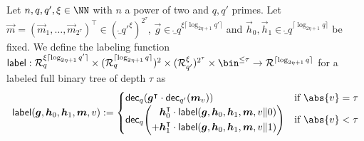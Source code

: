 
\begin{definition}\label{def:label}
  Let $n,q,q',\xi\in\NN$ with $n$ a power of two and $q,q'$ primes.
  Let $\vec{m}=(\vec{m}_{1},\dots,\vec{m}_{{2^{\tau}}})^\intercal\in(\ring_{q'}^\xi)^{2^{\tau}}$, $\vec{g} \in \ring_{q}^{\xi\lceil\log_{2\eta+1} q'\rceil}$ and $\vec{h}_0,\vec{h}_1 \in \ring_q^{\lceil\log_{2\eta+1} q\rceil}$ be fixed.
  We define the labeling function $\lbl : \ring_{q}^{\xi\lceil\log_{2\eta+1} q'\rceil} \times (\ring_q^{\lceil\log_{2\eta+1} q\rceil})^2 \times (\ring^\xi_{q'})^{2^{\tau}}\times \bin^{\leq \tau} \to \ring^{\lceil \log_{2\eta+1} q \rceil}$ for a labeled full binary tree of depth $\tau$ as
  \[
    \lbl(\vec{g}, \vec{h}_0,\vec{h}_1,\vec{m},v) := \begin{cases} \decomp_{q}(\vec{g}^\intercal\cdot \decomp_{q'}(\vec{m}_{v})) & \text{if } \abs{v}=\tau\\ \decomp_q\mleft(\begin{aligned}\vec{h}_0^\intercal \cdot\lbl(\vec{g},\vec{h}_0,\vec{h}_1,\vec{m},v\Vert 0)\\ + \vec{h}_1^\intercal \cdot\lbl(\vec{g},\vec{h}_0,\vec{h}_1,\vec{m},v\Vert 1)\end{aligned}\mright)& \text{if } \abs{v}< \tau\end{cases}
  \]
\end{definition}

